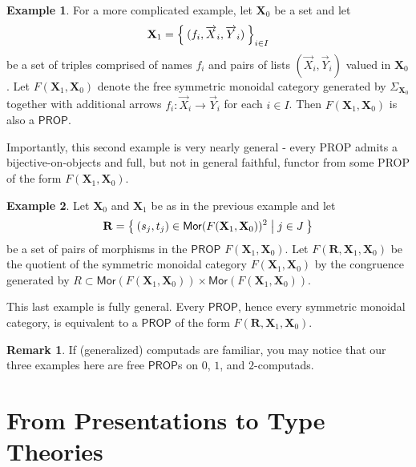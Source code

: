\documentclass[pra,floatfix,
amsmath,superscriptaddress, 12pt]{article}
\theoremstyle{definition}
\newtheorem*{remark}{Remark}
\newtheorem*{example}{Example}
\newcommand{\msf}[1]{\mathsf{#1}}
\begin{document}
\begin{example} For a more complicated example, let $\mathbf{X}_0$ be a set and let
\[
    \mathbf{X}_1
    =
    \Set{(f_i,\overrightarrow{X}_i,\overrightarrow{Y}_i)}_{i\in I}
\]
be a set of triples comprised of names $f_i$ and pairs of lists $(\overrightarrow{X}_i,\overrightarrow{Y}_i)$ valued in $\mathbf{X}_0$. Let $F(\mathbf{X}_1,\mathbf{X}_0)$ denote the free symmetric monoidal category generated by $\Sigma_{\mathbf{X}_0}$ together with additional arrows $f_{i}:\overrightarrow{X}_i \longrightarrow \overrightarrow{Y}_i$ for each $i\in I$. Then $F(\mathbf{X}_1,\mathbf{X}_0)$ is also a $\msf{PROP}$.

\end{example}

Importantly, this second example is very nearly general - every \textsf{PROP} admits a bijective-on-objects and full, but not in general faithful, functor from some \textsf{PROP} of the form $F(\mathbf{X}_1,\mathbf{X}_0)$.

\begin{example}
 Let  $\mathbf{X}_0$ and $\mathbf{X}_1$ be as in the previous example and let
 \[
    \mathbf{R}=\Set{ (s_j,t_j) \in \mathsf{Mor}(F(\mathbf{X}_1,\mathbf{X}_0))^2 | j \in J}
 \]
 be a set of pairs of morphisms in the $\mathsf{PROP}$ $F(\mathbf{X}_1,\mathbf{X}_0)$. Let $F(\mathbf{R},\mathbf{X}_1,\mathbf{X}_0)$ be the quotient of the symmetric monoidal category $F(\mathbf{X}_1,\mathbf{X}_0)$ by the congruence generated by $R \subset \mathsf{Mor}(F(\mathbf{X}_1,\mathbf{X}_0)) \times \mathsf{Mor}(F(\mathbf{X}_1,\mathbf{X}_0))$.
\end{example}

This last example is fully general. Every $\mathsf{PROP}$, hence every symmetric monoidal category, is equivalent to a $\mathsf{PROP}$ of the form $F(\mathbf{R},\mathbf{X}_1,\mathbf{X}_0)$.

\begin{remark} If (generalized) computads are familiar, you may notice that our three examples here are free $\mathsf{PROP}$s on $0$, $1$, and $2$-computads.
\end{remark}

\section{From Presentations to Type Theories}
\end{document}
